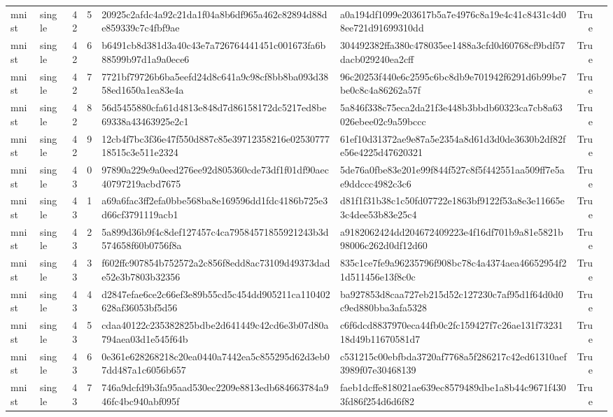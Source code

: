 \begin{tabular}{llrrllrl}
mnist & single & 42 & 5 & 20925c2afdc4a92c21da1f04a8b6df965a462c82894d88de859339c7c4fbf9ae & a0a194df1099e203617b5a7e4976c8a19e4c41c8431c4d08ee721d91699310dd & True &  \\
mnist & single & 42 & 6 & b6491cb8d381d3a40c43e7a726764441451c001673fa6b88599b97d1a9a0ece6 & 304492382ffa380c478035ee1488a3cfd0d60768cf9bdf57dacb029240ea2cff & True &  \\
mnist & single & 42 & 7 & 7721bf79726b6ba5eefd24d8c641a9c98cf8bb8ba093d3858ed1650a1ea83e4a & 96c20253f440e6c2595c6bc8db9e701942f6291d6b99be7be0c8c4a86262a57f & True &  \\
mnist & single & 42 & 8 & 56d5455880cfa61d4813e848d7d86158172dc5217ed8be69338a43463925e2c1 & 5a846f338c75eca2da21f3e448b3bbdb60323ca7cb8a63026ebee02c9a59bccc & True &  \\
mnist & single & 42 & 9 & 12cb4f7bc3f36e47f550d887c85e39712358216e0253077718515c3e511e2324 & 61ef10d31372ae9e87a5e2354a8d61d3d0de3630b2df82fe56e4225d47620321 & True &  \\
mnist & single & 43 & 0 & 97890a229e9a0eed276ee92d805360cde73df1f01df90aec40797219acbd7675 & 5de76a0fbe83e201e99f844f527c8f5f442551aa509ff7e5ae9ddccc4982c3c6 & True &  \\
mnist & single & 43 & 1 & a69a6fac3ff2efa0bbe568ba8e169596dd1fdc4186b725e3d66cf3791119acb1 & d81f1f31b38c1c50fd07722e1863bf9122f53a8e3e11665e3c4dee53b83e25c4 & True &  \\
mnist & single & 43 & 2 & 5a899d36b9f4c8def127457c4ca79584571855921243b3d574658f60b0756f8a & a9182062424dd204672409223e4f16df701b9a81e5821b98006c262d0df12d60 & True &  \\
mnist & single & 43 & 3 & f602ffc907854b752572a2c856f8edd8ac73109d49373dade52e3b7803b32356 & 835c1ce7fe9a96235796f908bc78c4a4374aea46652954f21d511456e13f8c0c & True &  \\
mnist & single & 43 & 4 & d2847efae6ce2c66ef3e89b55cd5c454dd905211ca110402628af36053bf5d56 & ba927853d8caa727eb215d52c127230c7af95d1f64d0d0c9ed880bba3afa5328 & True &  \\
mnist & single & 43 & 5 & cdaa40122c235382825bdbe2d641449c42cd6e3b07d80a794aea03d1e545f64b & c6f6dcd8837970eca44fb0c2fc159427f7c26ae131f7323118d49b11670581d7 & True &  \\
mnist & single & 43 & 6 & 0e361e628268218c20ea0440a7442ea5c855295d62d3eb07dd487a1c6056b657 & c531215c00ebfbda3720af7768a5f286217c42ed61310aef3989f07e30468139 & True &  \\
mnist & single & 43 & 7 & 746a9dcfd9b3fa95aad530ec2209e8813edb684663784a946fc4bc940abf095f & faeb1dcffe818021ae639ec8579489dbe1a8b44c9671f4303fd86f254d6d6f82 & True &  \\

\end{tabular}
